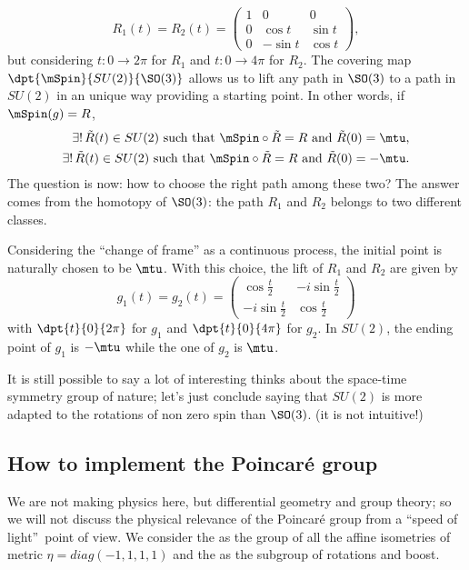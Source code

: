 \[
  R_1(t)=R_2(t)=
\begin{pmatrix}
1&0&0\\
0&\cos t&\sin t\\
0&-\sin t&\cos t
\end{pmatrix},
\]
but considering $t\colon 0\to 2\pi$ for $R_1$ and $t\colon 0\to 4\pi$ for $R_2$. The covering map $\dpt{\mSpin}{SU(2)}{\SO(3)}$ allows us to lift any path in $\SO(3)$ to a path in $SU(2)$ in an unique way providing a starting point. In other words, if $\mSpin(g)=R$,
\[
\begin{split}
  \exists !\, \tilde{R}(t)\in SU(2)\text{ such that }\mSpin\circ\tilde{R}=R \text{ and } \tilde{R}(0)=\mtu,\\
  \exists !\, \tilde{R}(t)\in SU(2)\text{ such that }\mSpin\circ\tilde{R}=R \text{ and } \tilde{R}(0)=-\mtu.
\end{split}
\]
The question is now: how to choose the right path among these two? The answer comes from the homotopy of $\SO(3)$: the path $R_1$ and $R_2$ belongs to two different classes.

Considering the ``change of frame''{} as a continuous process, the initial point is naturally chosen to be $\mtu$. With this choice, the lift of $R_1$ and $R_2$ are given by
\[
  g_1(t)=g_2(t)=
\begin{pmatrix}
\cos\frac{t}{2}&-i\sin\frac{t}{2}\\
-i\sin\frac{t}{2}&\cos \frac{t}{2}
\end{pmatrix}
\]
with $\dpt{t}{0}{2\pi}$ for $g_1$ and $\dpt{t}{0}{4\pi}$ for $g_2$. In $SU(2)$, the ending point of $g_1$ is $-\mtu$ while the one of $g_2$ is $\mtu$.

It is still possible to say a lot of interesting thinks about the space-time symmetry group of nature; let's just conclude saying that $SU(2)$ is more adapted to the rotations of non zero spin than $\SO(3)$. (it is  not intuitive!)
\subsection{How to implement the Poincaré group}
\label{pg:poincare_act}

We are not making physics here, but differential geometry and group theory; so we will not discuss the physical relevance of the Poincaré group from a ``speed of light''\ point of view. We consider the  as the group of all the affine isometries of metric $\eta=diag(-1,1,1,1)$ and the  as the subgroup of rotations and boost.

